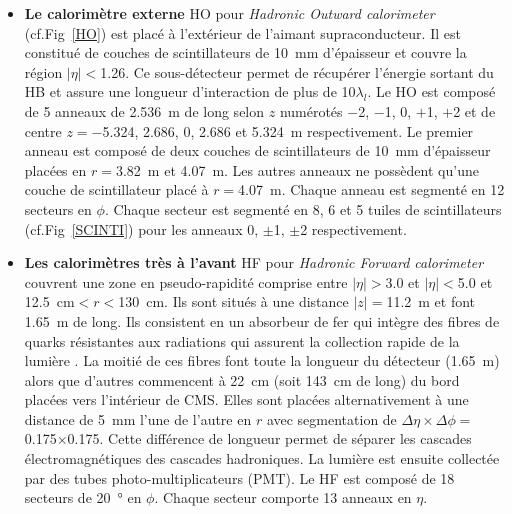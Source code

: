 \begin{itemize}[label=$\bullet$]
	\item \textbf{Le calorimètre externe} HO pour \textit{Hadronic Outward calorimeter} (cf.Fig~\ref{HO}) est placé à l'extérieur de l'aimant supraconducteur. Il est constitué de couches de scintillateurs de \SI{10}{\milli\meter} d'épaisseur et couvre la région $|\eta|<$\num{1.26}. Ce sous-détecteur permet de récupérer l'énergie sortant du HB et assure une longueur d'interaction de plus de \num{10}$\lambda_{l}$. Le HO est composé de \num{5} anneaux de \SI{2.536}{\meter} de long selon $z$ numérotés $-$\num{2}, $-$\num{1}, \num{0}, $+$\num{1}, $+$\num{2} et de centre $z=-$\num{5.324}, \num{2.686}, \num{0}, \num{2.686} et \SI{5.324}{\meter} respectivement. Le premier anneau est composé de deux couches de scintillateurs de \SI{10}{\milli\meter} d'épaisseur placées en $r=$\SI{3.82}{\meter} et \SI{4.07}{\meter}. Les autres anneaux ne possèdent qu'une couche de scintillateur placé à $r=$\SI{4.07}{\meter}. Chaque anneau est segmenté en \num{12} secteurs en $\phi$. Chaque secteur est segmenté en \num{8}, \num{6} et \num{5} tuiles de scintillateurs (cf.Fig~\ref{SCINTI}) pour les anneaux \num{0}, $\pm$\num{1}, $\pm$\num{2} respectivement.
	\item \textbf{Les calorimètres très à l'avant} HF pour \textit{Hadronic Forward calorimeter} couvrent une zone en pseudo-rapidité comprise entre $|\eta|>$\num{3.0} et $|\eta|<$\num{5.0} et \SI{12.5}{\centi\meter}$<r<$\SI{130}{\centi\meter}. Ils sont situés à une distance $|z|=$\SI{11.2}{\meter} et font \SI{1.65}{\meter} de long. Ils consistent en un absorbeur de fer qui intègre des fibres de quarks résistantes aux radiations qui assurent la collection rapide de la lumière . La moitié de ces fibres font toute la longueur du détecteur (\SI{1.65}{\meter}) alors que d'autres commencent à \SI{22}{\centi\meter} (soit \SI{143}{\centi\meter} de long) du bord placées vers l'intérieur de CMS. Elles sont placées alternativement à une distance de \SI{5}{\milli\meter} l'une de l'autre en $r$  avec segmentation de $\Delta\eta\times\Delta\phi=$\num{0.175}$\times$\num{0.175}. Cette différence de longueur permet de séparer les cascades électromagnétiques des cascades hadroniques. La lumière est ensuite collectée par des tubes photo-multiplicateurs (PMT). Le HF est composé de \num{18} secteurs de \SI{20}{\degree} en $\phi$. Chaque secteur comporte \num{13} anneaux en $\eta$.
\end{itemize}
